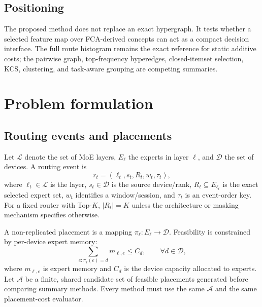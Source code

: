 \documentclass[a4paper,preprint,review,12pt,authoryear]{elsarticle}
\newcommand{\PiSet}{\mathcal{A}}
\begin{document}
\subsection{Positioning}

The proposed method does not replace an exact hypergraph. It tests whether a selected feature map over FCA-derived concepts can act as a compact decision interface. The full route histogram remains the exact reference for static additive costs; the pairwise graph, top-frequency hyperedges, closed-itemset selection, KCS, clustering, and task-aware grouping are competing summaries.

\section{Problem formulation}
\label{sec:problem}

\subsection{Routing events and placements}

Let $\mathcal{L}$ denote the set of MoE layers, $E_\ell$ the experts in layer $\ell$, and $\mathcal{D}$ the set of devices. A routing event is
\begin{equation}
 r_t=(\ell_t,s_t,R_t,w_t,\tau_t),
 \label{eq:event}
\end{equation}
where $\ell_t\in\mathcal{L}$ is the layer, $s_t\in\mathcal{D}$ is the source device/rank, $R_t\subseteq E_{\ell_t}$ is the exact selected expert set, $w_t$ identifies a window/session, and $\tau_t$ is an event-order key. For a fixed router with Top-$K$, $|R_t|=K$ unless the architecture or masking mechanism specifies otherwise.

A non-replicated placement is a mapping $\pi_\ell:E_\ell\rightarrow\mathcal{D}$. Feasibility is constrained by per-device expert memory:
\begin{equation}
 \sum_{e:\pi_\ell(e)=d}m_{\ell,e}\le C_d,\qquad \forall d\in\mathcal{D},
 \label{eq:capacity}
\end{equation}
where $m_{\ell,e}$ is expert memory and $C_d$ is the device capacity allocated to experts. Let $\PiSet$ be a finite, shared candidate set of feasible placements generated before comparing summary methods. Every method must use the same $\PiSet$ and the same placement-cost evaluator.
\end{document}
